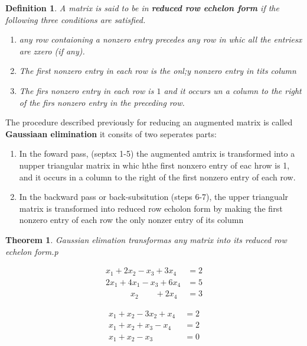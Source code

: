 \documentclass[10pt, oneside]{article}
\newtheorem{thm}{Theorem}
\newtheorem{defn}{Definition}
\begin{document}
\begin{defn}
	A matrix is said to be in \textbf{reduced row echelon form} if the following three conditions are satisfied.

	\begin{enumerate}
		\item any row contaioning a nonzero entry precedes any row in whic all the entriesx are zxero (if any).
		\item The first nonzero entry in each row is the onl;y nonzero entry in tits column
		\item The firs nonzero entry in each row is $1$ and it occurs un a column to the right of the firs nonzero entry in the preceding row.
	\end{enumerate}
\end{defn}

The procedure described previously for reducing an augmented matrix is called \textbf{Gaussiaan elimination} it consits of two seperates parts:

\begin{enumerate}
	\item In the foward pass, (septsx 1-5) the augmented amtrix is transformed into a nupper triangular matrix in whic hthe first nonxero entry of eac hrow is 1, and it occurs in a column to the right of
	      the first nonzero entry of each row.
	\item In the backward pass or back-subsitution (steps 6-7), the upper triangualr matrix is transformed into reduced row echolon form by making the first nonzero entry of each row the only nonzer
	      entry of its column
\end{enumerate}

\begin{thm}
	Gaussian elimation transformas any matrix into its reduced row echelon form.p
\end{thm}

\[
	\begin{array}{ll}
		x_1 + 2x_2 - x_3 + 3x_4                   & = 2 \\
		2x_1 + 4x_1 - x_3 + 6x_4                  & = 5 \\
		\quad \quad \quad x_2 \quad \quad  + 2x_4 & = 3
	\end{array}
\]

\[
	\begin{array}{ll}
		x_1 + x_2  -3x_2 + x_4            & = 2 \\
		x_1 + x_2 + x_3 - x_4             & = 2 \\
		x_1 + x_2 - x_3 \quad \quad \quad & = 0
	\end{array}
\]
\end{document}
